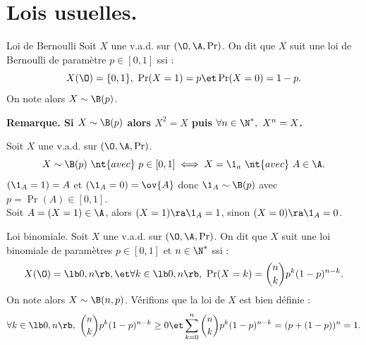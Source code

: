 \documentclass[11pt]{article}
\begin{document}
\vspace*{-0.8cm}

\section{Lois usuelles.}

\begin{defi}{Loi de Bernoulli}{}
    Soit $X$ une v.a.d. sur $(\O,\A,\Pr)$. On dit que $X$ suit une loi de Bernoulli de paramètre $p\in[0,1]$ ssi :\\[-0.4cm]
    \begin{equation*}
        X(\O) = \{0,1\}, ~ \Pr(X=1)=p \et \Pr(X=0) = 1-p.
    \end{equation*}
    On note alors $X\sim\B(p)$.
\end{defi}

\vspace*{-0.8cm}

\bf{Remarque.} Si $X\sim\B(p)$ alors $X^2=X$ puis $\forall n \in \N^*, ~ X^n = X$.

\begin{prop}{}{}
    Soit $X$ une v.a.d. sur $(\O,\A,\Pr)$.
    \begin{equation*}
        X \sim \B(p) ~ \nt{avec} ~ p\in[0,1] \iff X=\1_a ~ \nt{avec} ~ A\in\A.
    \end{equation*}
    \tcblower
    \boxed{\la} $(\1_A=1)=A$ et $(\1_A = 0) = \ov{A}$ donc $\1_A\sim\B(p)$ avec $p=\Pr(A)\in[0,1]$.\\
    \boxed{\ra} Soit $A=(X=1)\in\A$, alors $(X=1)\ra \1_A=1$, sinon $(X=0)\ra\1_A=0$.
\end{prop}

\vspace*{-0.8cm}

\begin{defi}{Loi binomiale.}{}
    Soit $X$ une v.a.d. sur $(\O,\A,\Pr)$. On dit que $X$ suit une loi binomiale de paramètres $p\in[0,1]$ et $n\in\N^*$ ssi :\\[-0.3cm]
    \begin{equation*}
        X(\O) = \lb0,n\rb, \et \forall k \in \lb0,n\rb, ~ \Pr(X=k) = \binom{n}{k}p^k(1-p)^{n-k}.
    \end{equation*}
    On note alors $X\sim \B(n,p)$.
    \tcblower
    Vérifions que la loi de $X$ est bien définie :
    \begin{equation*}
        \forall k \in \lb0,n\rb, ~ \binom{n}{k}p^k(1-p)^{n-k} \geq 0 \et \sum_{k=0}^n\binom{n}{k}p^k(1-p)^{n-k}=(p+(1-p))^n = 1.
    \end{equation*}
\end{defi}
\end{document}
